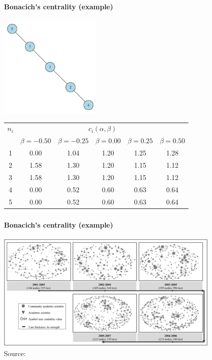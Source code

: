 \documentclass[8pt]{beamer}
\begin{document}
\begin{frame}
\frametitle{\insertsection}
\framesubtitle{Bonacich's centrality (example)}

\centering
\includegraphics[width=5cm]{bonacich}
	
\small
\begin{table}
\begin{tabular}{cccccc}
\toprule
$n_i$ 	& \multicolumn{5}{c}{\textbf{$c_i(\alpha,\beta)$}}\\
\cline{2-6}
& 
$\beta = -0.50$ &
$\beta = -0.25$ &
$\beta =  0.00$ &
$\beta =  0.25$ &
$\beta =  0.50$\\

\hline
1 & 0.00 & 1.04 & \cellcolor{green!50}1.20 & \cellcolor{green!50}1.25 & \cellcolor{green!50}1.28 \\
2 & \cellcolor{green!50}1.58 & \cellcolor{green!50}1.30 & \cellcolor{green!50}1.20 & 1.15 & 1.12 \\
3 & \cellcolor{green!50}1.58 & \cellcolor{green!50}1.30 & \cellcolor{green!50}1.20 & 1.15 & 1.12 \\
4 & 0.00 & 0.52 & 0.60 & 0.63 & 0.64 \\
5 & 0.00 & 0.52 & 0.60 & 0.63 & 0.64 \\
\bottomrule
\end{tabular}
\end{table}

\end{frame}


\begin{frame}
\frametitle{\insertsection}
\framesubtitle{Bonacich's centrality (example)}

\centering  
\includegraphics[width=11cm]{job1}\\
\tiny Source: \cite{Rotolo2013}
\end{frame}
\end{document}
